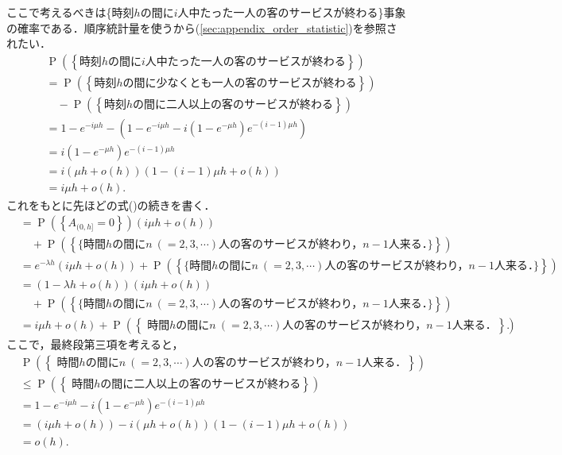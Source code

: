 \documentclass[a4j,papersize,disablejfam,slide,14pt]{jsarticle}
\def\exp#1{e^{#1}} %
\def\prob#1{\operatorname{P} \left(\left\{ #1 \right\}\right)} %
\begin{document}
    ここで考えるべきは\{時刻$h$の間に$i$人中たった一人の客のサービスが終わる\}事象の確率である．順序統計量を使うから(\ref{sec:appendix_order_statistic})を参照されたい．
    \begin{align}
    	&\prob{\mbox{時刻$h$の間に$i$人中たった一人の客のサービスが終わる}} \\
        &= \prob{\mbox{時刻$h$の間に少なくとも一人の客のサービスが終わる}} \\
        	&\quad- \prob{\mbox{時刻$h$の間に二人以上の客のサービスが終わる}} \\
        &= 1 - \exp{-i \mu h} - \left( 1 - \exp{-i \mu h} - i (1 - \exp{-\mu h})\exp{-(i-1) \mu h} \right) \\
        &= i (1 - \exp{-\mu h})\exp{-(i-1) \mu h} \\
        &= i (\mu h + o(h))(1 - (i-1)\mu h + o(h)) \\
        &= i \mu h + o(h).
    \end{align}
    これをもとに先ほどの式()の続きを書く．
    \begin{align}
            &= \prob{A_{(0,h]} = 0} (i \mu h + o(h)) \\
            &\quad+ \prob{\mbox{\{ 時間$h$の間に$n\ (=2,3,\cdots)$人の客のサービスが終わり，$n-1$人来る．\}}} \\
            &= \exp{-\lambda h} (i \mu h + o(h)) + \prob{\mbox{\{ 時間$h$の間に$n\ (=2,3,\cdots)$人の客のサービスが終わり，$n-1$人来る．\}}} \\
            &= ( 1 - \lambda h + o(h) ) (i \mu h + o(h)) \\
            &\quad+ \prob{\mbox{\{ 時間$h$の間に$n\ (=2,3,\cdots)$人の客のサービスが終わり，$n-1$人来る．\}}} \\
            &= i \mu h + o(h) + \prob{\mbox{ 時間$h$の間に$n\ (=2,3,\cdots)$人の客のサービスが終わり，$n-1$人来る．}}.
    \end{align}
    ここで，最終段第三項を考えると，
    \begin{align}
    		&\prob{\mbox{ 時間$h$の間に$n\ (=2,3,\cdots)$人の客のサービスが終わり，$n-1$人来る．}} \\
            &\leq \prob{\mbox{ 時間$h$の間に二人以上の客のサービスが終わる}} \\
        	&= 1 - \exp{-i \mu h} - i (1 - \exp{-\mu h})\exp{-(i-1) \mu h} \\
        	&= (i \mu h + o(h)) - i (\mu h + o(h))(1 - (i-1) \mu h + o(h)) \\
        	&= o(h).
    \end{align}
\end{document}
